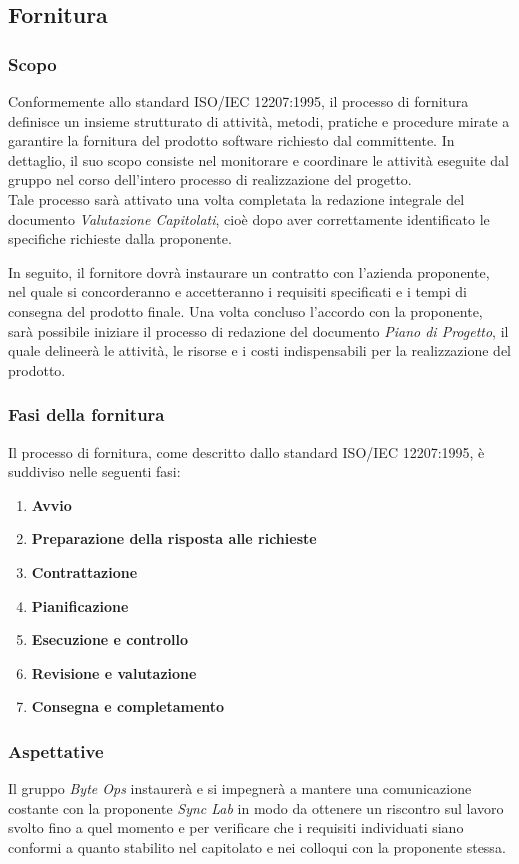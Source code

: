 \subsection{Fornitura}
\subsubsection{Scopo}
Conformemente allo standard ISO/IEC 12207:1995, il processo di fornitura definisce un insieme strutturato di attività, metodi, pratiche e procedure mirate a garantire la fornitura del prodotto software richiesto dal committente. 
In dettaglio, il suo scopo consiste nel monitorare e coordinare le attività eseguite dal gruppo nel corso dell'intero processo di realizzazione del progetto.\\
Tale processo sarà attivato una volta completata la redazione integrale del documento \textit{Valutazione Capitolati}, cioè dopo aver correttamente identificato le specifiche richieste dalla proponente.

In seguito, il fornitore dovrà instaurare un contratto con l'azienda proponente, nel quale si concorderanno e accetteranno i requisiti specificati e i tempi di consegna del prodotto finale. Una volta concluso l'accordo con la proponente, sarà possibile iniziare il processo di redazione del documento
\textit{Piano di Progetto}, il quale delineerà le attività, le risorse e i costi indispensabili per la realizzazione del prodotto.

\subsubsection{Fasi della fornitura}
Il processo di fornitura, come descritto dallo standard ISO/IEC 12207:1995, è suddiviso nelle seguenti fasi:
\begin{enumerate}
    \item \textbf{Avvio}
    \item \textbf{Preparazione della risposta alle richieste}
    \item \textbf{Contrattazione}
    \item \textbf{Pianificazione}
    \item \textbf{Esecuzione e controllo}
    \item \textbf{Revisione e valutazione}
    \item \textbf{Consegna e completamento}
\end{enumerate}

\subsubsection{Aspettative}
Il gruppo \textit{Byte Ops} instaurerà e si impegnerà a mantere una comunicazione costante con la proponente \textit{Sync Lab} in modo da ottenere un riscontro sul lavoro svolto fino a quel momento e per verificare che i requisiti individuati siano conformi a quanto stabilito nel capitolato e nei colloqui con la proponente stessa.\\

